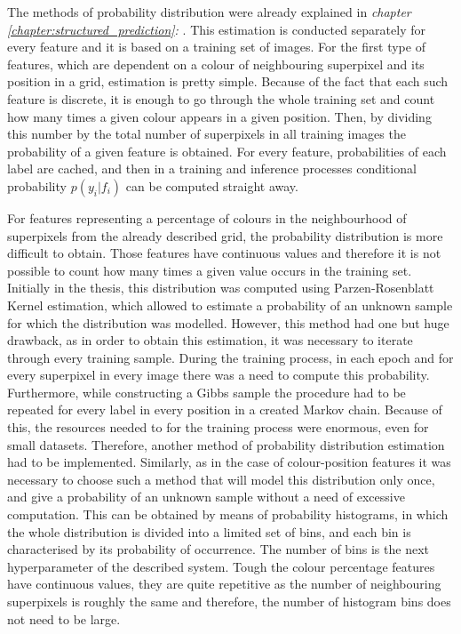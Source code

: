 The methods of probability distribution were already explained in \textit{chapter \ref{chapter:structured_prediction}: }. This estimation is conducted separately for every feature and it is based on a training set of images. For the first type of features, which are dependent on a colour of neighbouring superpixel and its position in a grid, estimation is pretty simple. Because of the fact that each such feature is discrete, it is enough to go through the whole training set and count how many times a given colour appears in a given position. Then, by dividing this number by the total number of superpixels in all training images the probability of a given feature is obtained. For every feature, probabilities of each label are cached, and then in a training and inference processes conditional probability $p(y_i|f_i)$ can be computed straight away.

For features representing a percentage of colours in the neighbourhood of superpixels from the already described grid, the probability distribution is more difficult to obtain. Those features have continuous values and therefore it is not possible to count how many times a given value occurs in the training set. Initially in the thesis, this distribution was computed using Parzen-Rosenblatt Kernel estimation, which allowed to estimate a probability of an unknown sample for which the distribution was modelled. However, this method had one but huge drawback, as in order to obtain this estimation, it was necessary to iterate through every training sample. During the training process, in each epoch and for every superpixel in every image there was a need to compute this probability. Furthermore, while constructing a Gibbs sample the procedure had to be repeated for every label in every position in a created Markov chain. Because of this, the resources needed to for the training process were enormous, even for small datasets. Therefore, another method of probability distribution estimation had to be implemented. Similarly, as in the case of colour-position features it was necessary to choose such a method that will model this distribution only once, and give a probability of an unknown sample without a need of excessive computation. This can be obtained by means of probability histograms, in which the whole distribution is divided into a limited set of bins, and each bin is characterised by its probability of occurrence. The number of bins is the next hyperparameter of the described system. Tough the colour percentage features have continuous values, they are quite repetitive as the number of neighbouring superpixels is roughly the same and therefore, the number of histogram bins does not need to be large. 

